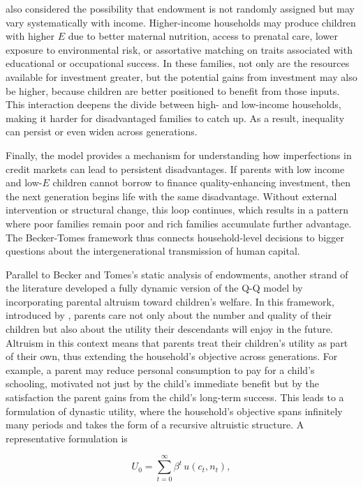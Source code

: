 \documentclass[]{AEA}
\begin{document}
\citet{becker1976child} also considered the possibility that endowment
is not randomly assigned but may vary systematically with income.
Higher-income households may produce children with higher \(E\) due to
better maternal nutrition, access to prenatal care, lower exposure to
environmental risk, or assortative matching on traits associated with
educational or occupational success. In these families, not only are the
resources available for investment greater, but the potential gains from
investment may also be higher, because children are better positioned to
benefit from those inputs. This interaction deepens the divide between
high- and low-income households, making it harder for disadvantaged
families to catch up. As a result, inequality can persist or even widen
across generations.

Finally, the model provides a mechanism for understanding how
imperfections in credit markets can lead to persistent disadvantages. If
parents with low income and low-\(E\) children cannot borrow to finance
quality-enhancing investment, then the next generation begins life with
the same disadvantage. Without external intervention or structural
change, this loop continues, which results in a pattern where poor
families remain poor and rich families accumulate further advantage. The
Becker-Tomes framework thus connects household-level decisions to bigger
questions about the intergenerational transmission of human capital.

Parallel to Becker and Tomes's static analysis of endowments, another
strand of the literature developed a fully dynamic version of the Q-Q
model by incorporating parental altruism toward children's welfare. In
this framework, introduced by \citet{barro1989fertility}, parents care
not only about the number and quality of their children but also about
the utility their descendants will enjoy in the future. Altruism in this
context means that parents treat their children's utility as part of
their own, thus extending the household's objective across generations.
For example, a parent may reduce personal consumption to pay for a
child's schooling, motivated not just by the child's immediate benefit
but by the satisfaction the parent gains from the child's long-term
success. This leads to a formulation of dynastic utility, where the
household's objective spans infinitely many periods and takes the form
of a recursive altruistic structure. A representative formulation is

\[
U_{0} = \sum_{t=0}^{\infty} \beta^{t}\,u(c_{t}, n_{t}),
\]
\end{document}
